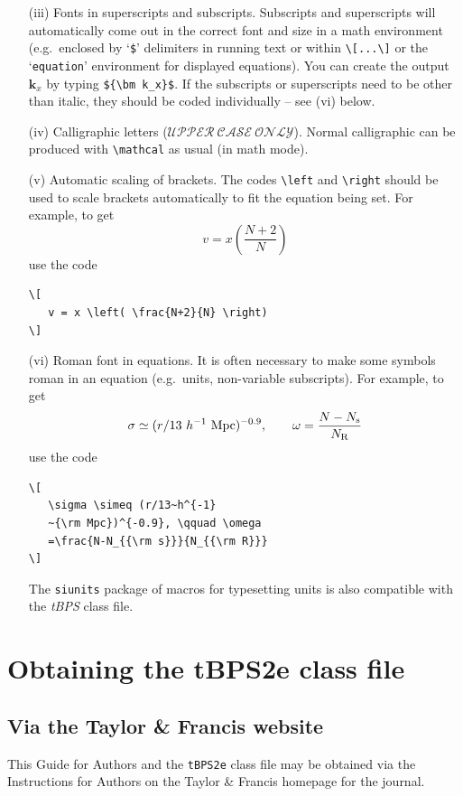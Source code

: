 \documentclass{tBPS2e}
\theoremstyle{plain}
\theoremstyle{definition}
\theoremstyle{remark}
\begin{document}
\begin{enumerate}
\item[(iii)] Fonts in superscripts and subscripts. Subscripts and superscripts will automatically come out in the correct font
and size in a math environment (e.g.\ enclosed by `\verb"$"'
delimiters in running text or within \verb"\[...\]" or the
`\texttt{equation}' environment for displayed equations). You can create
the output ${\bm k_x}$ by typing \verb"${\bm k_x}$". If the
subscripts or superscripts need to be other than italic, they
should be coded individually -- see (vi) below.

\item[(iv)] Calligraphic letters ($\mathcal{UPPER\ CASE\ ONLY}$).
Normal calligraphic can be produced with \verb"\mathcal" as usual (in
math mode).

\item[(v)] Automatic scaling of brackets. The codes \verb"\left" and
\verb"\right" should  be used to scale brackets automatically to
fit the equation being set. For example, to get
\[
   v = x \left( \frac{N+2}{N} \right)
\]
use the code
\begin{verbatim}
\[
   v = x \left( \frac{N+2}{N} \right)
\]
\end{verbatim}

\item[(vi)] Roman font in equations. It is often necessary to make some
symbols roman in an equation (e.g.\ units, non-variable
subscripts). For example, to get
\[
   \sigma \simeq (r/13~h^{-1}~{\rm Mpc})^{-0.9},
   \qquad \omega = \frac{N-N_{\rm s}}{N_{\rm R}}
\]
\noindent use the code
\begin{verbatim}
\[
   \sigma \simeq (r/13~h^{-1}
   ~{\rm Mpc})^{-0.9}, \qquad \omega
   =\frac{N-N_{{\rm s}}}{N_{{\rm R}}}
\]
\end{verbatim}
The \texttt{siunits} package of macros for typesetting units is also compatible with the \textit{tBPS} class file.
\end{enumerate}


\section{Obtaining the tBPS2e class file}\label{FTP}

\subsection{Via the Taylor \& Francis website}

This Guide for Authors and the \verb"tBPS2e" class file may be obtained via the Instructions for Authors
on the Taylor \& Francis homepage for the journal.
\end{document}
